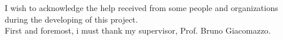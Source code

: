 I wish to acknowledge the help received from some people and organizations during the developing of this project.\\
First and foremost, i must thank my supervisor, Prof. Bruno Giacomazzo.
